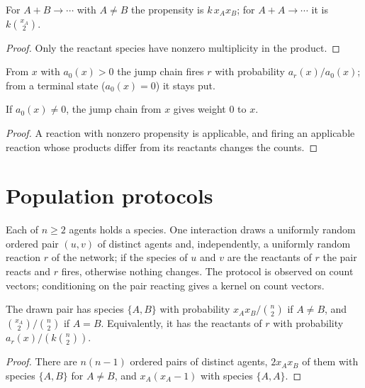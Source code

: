 \begin{lemma}[Propensities]\label{lem:propensity}
\leanok{}
For $A + B \to \cdots$ with $A \ne B$ the propensity is $k\, x_A x_B$; for $A + A \to \cdots$ it
is $k \binom{x_A}{2}$.
\end{lemma}
\begin{proof}\leanok
Only the reactant species have nonzero multiplicity in the product.
\end{proof}

\begin{definition}\label{def:jump}
\leanok{}
From $x$ with $a_0(x) > 0$ the jump chain fires $r$ with probability $a_r(x)/a_0(x)$; from a
terminal state ($a_0(x) = 0$) it stays put.
\end{definition}

\begin{lemma}\label{lem:jump-self}
\leanok{}
If $a_0(x) \ne 0$, the jump chain from $x$ gives weight $0$ to $x$.
\end{lemma}
\begin{proof}\leanok
A reaction with nonzero propensity is applicable, and firing an applicable reaction whose
products differ from its reactants changes the counts.
\end{proof}

\section{Population protocols}
\begin{definition}\label{def:pp}
\leanok{}
Each of $n \ge 2$ agents holds a species. One interaction draws a uniformly random ordered pair
$(u, v)$ of distinct agents and, independently, a uniformly random reaction $r$ of the network;
if the species of $u$ and $v$ are the reactants of $r$ the pair reacts and $r$ fires, otherwise
nothing changes. The protocol is observed on count vectors; conditioning on the pair reacting
gives a kernel on count vectors.
\end{definition}

\begin{lemma}\label{lem:pair}
\leanok{}
The drawn pair has species $\{A, B\}$ with probability $x_A x_B / \binom{n}{2}$ if $A \ne B$, and
$\binom{x_A}{2} / \binom{n}{2}$ if $A = B$. Equivalently, it has the reactants of $r$ with
probability $a_r(x) / (k \binom{n}{2})$.
\end{lemma}
\begin{proof}\leanok
There are $n(n-1)$ ordered pairs of distinct agents, $2 x_A x_B$ of them with species $\{A, B\}$
for $A \ne B$, and $x_A(x_A - 1)$ with species $\{A, A\}$.
\end{proof}

